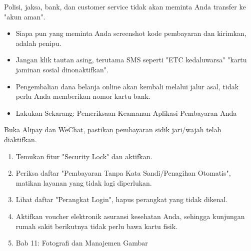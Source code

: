 \begin{tcbwarn}{Polisi, jaksa, bank, dan customer service tidak akan meminta Anda transfer ke "akun aman".}
\begin{itemize}
  \item Siapa pun yang meminta Anda screenshot kode pembayaran dan kirimkan, adalah penipu.
  \item Jangan klik tautan asing, terutama SMS seperti "ETC kedaluwarsa" "kartu jaminan sosial dinonaktifkan".
  \item Pengembalian dana belanja online akan kembali melalui jalur asal, tidak perlu Anda memberikan nomor kartu bank.
  \item Lakukan Sekarang: Pemeriksaan Keamanan Aplikasi Pembayaran Anda
\end{itemize}

\end{tcbwarn}

\begin{tcbpractice}{Buka Alipay dan WeChat, pastikan pembayaran sidik jari/wajah telah diaktifkan.}
\begin{enumerate}
  \item Temukan fitur "Security Lock" dan aktifkan.
  \item Periksa daftar "Pembayaran Tanpa Kata Sandi/Penagihan Otomatis", matikan layanan yang tidak lagi diperlukan.
  \item Lihat daftar "Perangkat Login", hapus perangkat yang tidak dikenal.
  \item Aktifkan voucher elektronik asuransi kesehatan Anda, sehingga kunjungan rumah sakit berikutnya tidak perlu bawa kartu fisik.
  \item Bab 11: Fotografi dan Manajemen Gambar
\end{enumerate}

\end{tcbpractice}
